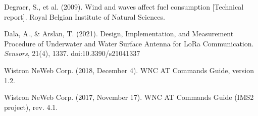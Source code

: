 \begin{thebibliography}{99}
    Degraer, S., et al. (2009). 
    Wind and waves affect fuel consumption [Technical report]. Royal Belgian Institute of Natural Sciences.
    
    Dala, A., \& Arslan, T. (2021). 
    Design, Implementation, and Measurement Procedure of Underwater and Water Surface Antenna for LoRa Communication. 
    \textit{Sensors}, 21(4), 1337. doi:10.3390/s21041337
    
    Wistron NeWeb Corp. (2018, December 4). 
    WNC AT Commands Guide, version 1.2.
    
    Wistron NeWeb Corp. (2017, November 17). 
    WNC AT Commands Guide (IMS2 project), rev. 4.1.
    
\end{thebibliography}
    
    